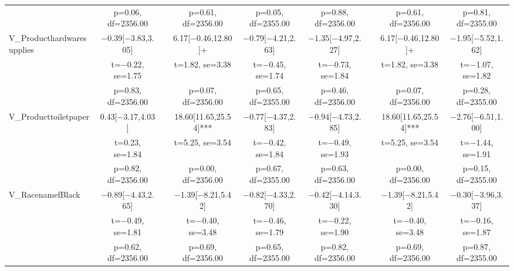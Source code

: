 \documentclass[]{report}
\begin{document}
\begin{table}
{\begin{tabular}[t]{lcccccccc}
		& p=\num{0.06}, df=\num{2356.00} &  & p=\num{0.61}, df=\num{2356.00} & p=\num{0.05}, df=\num{2355.00} & p=\num{0.88}, df=\num{2356.00} &  & p=\num{0.61}, df=\num{2356.00} & p=\num{0.81}, df=\num{2355.00}\\
		V\_Producthardwaresupplies & \num{-0.39}[\num{-3.83},\num{3.05}] &  & \num{6.17}[\num{-0.46},\num{12.80}]+ & \num{-0.79}[\num{-4.21},\num{2.63}] & \num{-1.35}[\num{-4.97},\num{2.27}] &  & \num{6.17}[\num{-0.46},\num{12.80}]+ & \num{-1.95}[\num{-5.52},\num{1.62}]\\
		& t=\num{-0.22}, se=\num{1.75} &  & t=\num{1.82}, se=\num{3.38} & t=\num{-0.45}, se=\num{1.74} & t=\num{-0.73}, se=\num{1.84} &  & t=\num{1.82}, se=\num{3.38} & t=\num{-1.07}, se=\num{1.82}\\
		& p=\num{0.83}, df=\num{2356.00} &  & p=\num{0.07}, df=\num{2356.00} & p=\num{0.65}, df=\num{2355.00} & p=\num{0.46}, df=\num{2356.00} &  & p=\num{0.07}, df=\num{2356.00} & p=\num{0.28}, df=\num{2355.00}\\
		V\_Producttoiletpaper & \num{0.43}[\num{-3.17},\num{4.03}] &  & \num{18.60}[\num{11.65},\num{25.54}]*** & \num{-0.77}[\num{-4.37},\num{2.83}] & \num{-0.94}[\num{-4.73},\num{2.85}] &  & \num{18.60}[\num{11.65},\num{25.54}]*** & \num{-2.76}[\num{-6.51},\num{1.00}]\\
		& t=\num{0.23}, se=\num{1.84} &  & t=\num{5.25}, se=\num{3.54} & t=\num{-0.42}, se=\num{1.84} & t=\num{-0.49}, se=\num{1.93} &  & t=\num{5.25}, se=\num{3.54} & t=\num{-1.44}, se=\num{1.91}\\
		& p=\num{0.82}, df=\num{2356.00} &  & p=\num{0.00}, df=\num{2356.00} & p=\num{0.67}, df=\num{2355.00} & p=\num{0.63}, df=\num{2356.00} &  & p=\num{0.00}, df=\num{2356.00} & p=\num{0.15}, df=\num{2355.00}\\
		V\_RacenamefBlack & \num{-0.89}[\num{-4.43},\num{2.65}] &  & \num{-1.39}[\num{-8.21},\num{5.42}] & \num{-0.82}[\num{-4.33},\num{2.70}] & \num{-0.42}[\num{-4.14},\num{3.30}] &  & \num{-1.39}[\num{-8.21},\num{5.42}] & \num{-0.30}[\num{-3.96},\num{3.37}]\\
		& t=\num{-0.49}, se=\num{1.81} &  & t=\num{-0.40}, se=\num{3.48} & t=\num{-0.46}, se=\num{1.79} & t=\num{-0.22}, se=\num{1.90} &  & t=\num{-0.40}, se=\num{3.48} & t=\num{-0.16}, se=\num{1.87}\\
		& p=\num{0.62}, df=\num{2356.00} &  & p=\num{0.69}, df=\num{2356.00} & p=\num{0.65}, df=\num{2355.00} & p=\num{0.82}, df=\num{2356.00} &  & p=\num{0.69}, df=\num{2356.00} & p=\num{0.87}, df=\num{2355.00}\\

\end{tabular}}
\end{table}
\end{document}
